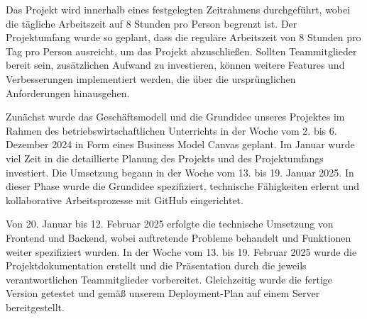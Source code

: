 \documentclass[a4paper,12pt]{article}
\begin{document}
Das Projekt wird innerhalb eines festgelegten Zeitrahmens durchgeführt, wobei
die tägliche Arbeitszeit auf 8 Stunden pro Person begrenzt ist. Der
Projektumfang wurde so geplant, dass die reguläre Arbeitszeit von 8 Stunden pro
Tag pro Person ausreicht, um das Projekt abzuschließen. Sollten Teammitglieder
bereit sein, zusätzlichen Aufwand zu investieren, können weitere Features und
Verbesserungen implementiert werden, die über die ursprünglichen Anforderungen
hinausgehen.

\newpage
Zunächst wurde das Geschäftsmodell und die Grundidee unseres Projektes im
Rahmen des betriebswirtschaftlichen Unterrichts in der Woche vom 2. bis 6.
Dezember 2024 in Form eines Business Model Canvas geplant. Im Januar wurde viel
Zeit in die detaillierte Planung des Projekts und des Projektumfangs
investiert. Die Umsetzung begann in der Woche vom 13. bis 19. Januar 2025. In
dieser Phase wurde die Grundidee spezifiziert, technische Fähigkeiten erlernt
und kollaborative Arbeitsprozesse mit GitHub eingerichtet.

Von 20. Januar bis 12. Februar 2025 erfolgte die technische Umsetzung von
Frontend und Backend, wobei auftretende Probleme behandelt und Funktionen
weiter spezifiziert wurden. In der Woche vom 13. bis 19. Februar 2025 wurde die
Projektdokumentation erstellt und die Präsentation durch die jeweils
verantwortlichen Teammitglieder vorbereitet. Gleichzeitig wurde die fertige
Version getestet und gemäß unserem Deployment-Plan auf einem Server
bereitgestellt.
\end{document}
